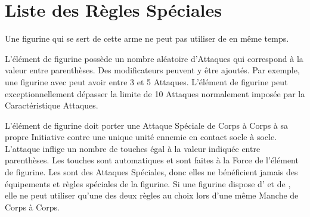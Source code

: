 \vspace*{20pt}
\begin{framed}
\vspace*{-10pt}
\setlength\columnseprule{0.5pt}
\begin{multicols}{3}\raggedcolumns
\noindent\hyperlink{grindingattacks}{\grindingattacks{}}\newline
\hyperlink{crushattack}{\crushattack}\newline
\hyperlink{sweepingattack}{\sweepingattack}\newline
\hyperlink{breathweapon}{\breathweapon{}}\newline
\hyperlink{stomp}{\stomp{}}\newline
\hyperlink{impacthits}{\impacthits{}}
\end{multicols}
\setlength\columnseprule{0pt}
\vspace*{-10pt}
\end{framed}

\newpage
\section{Liste des Règles Spéciales} 


Une figurine qui se sert de cette arme ne peut pas utiliser de \shield{} en même temps.


L'élément de figurine possède un nombre aléatoire d'Attaques qui correspond à la valeur entre parenthèses. Des modificateurs peuvent y être ajoutés. Par exemple, une figurine avec  peut avoir entre 3 et 5 Attaques. L'élément de figurine peut exceptionnellement dépasser la limite de 10 Attaques normalement imposée par la Caractéristique Attaques.


L'élément de figurine doit porter une Attaque Spéciale de Corps à Corps à sa propre Initiative contre une unique unité ennemie en contact socle à socle. L'attaque inflige un nombre de touches égal à la valeur indiquée entre parenthèses. Les touches sont automatiques et sont faites à la Force de l'élément de figurine. Les \grindingattacks{} sont des Attaques Spéciales, donc elles ne bénéficient jamais des équipements et règles spéciales de la figurine. Si une figurine dispose d'\grindingattacks{} et de \impacthits{}, elle ne peut utiliser qu'une des deux règles au choix lors d'une même Manche de Corps à Corps.

